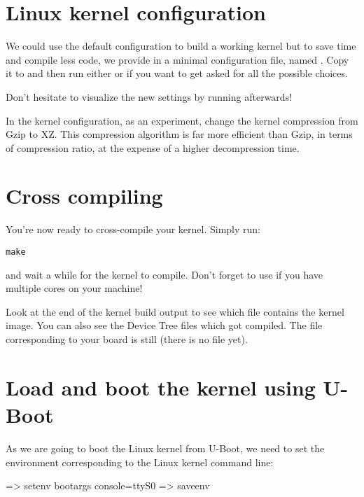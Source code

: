 \section{Linux kernel configuration}

We could use the  default configuration to
build a working kernel but to save time and compile less code, we
provide in
 a minimal configuration
file, named . Copy it to  and
then run either  or  if
you want to get asked for all the possible choices.

Don't hesitate to visualize the new settings by running
 afterwards!

In the kernel configuration, as an experiment, change the kernel
compression from Gzip to XZ. This compression algorithm is far more
efficient than Gzip, in terms of compression ratio, at the expense of
a higher decompression time.

\section{Cross compiling}

You're now ready to cross-compile your kernel. Simply run:

\begin{verbatim}
make
\end{verbatim}

and wait a while for the kernel to compile. Don't forget to use
 if you have multiple cores on your machine!

Look at the end of the kernel build output to see which file contains
the kernel image. You can also see the Device Tree  files
which got compiled. The  file corresponding to your
board is still  (there is no
 file yet).

\section{Load and boot the kernel using U-Boot}

As we are going to boot the Linux kernel from U-Boot,
we need to set the  environment corresponding
to the Linux kernel command line:

\begin{ubootinput}
=> setenv bootargs console=ttyS0
=> saveenv
\end{ubootinput}

